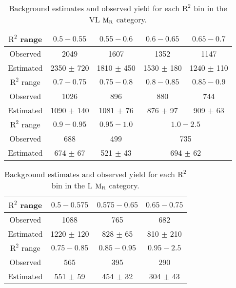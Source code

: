 {{{\begin{table}[h!]
\begin{center}
  \caption{\label{tab:LOOKUP_VL} Background estimates and observed
    yield for each $\mathrm{R}^2$ bin in the VL $\mathrm{M_{\rm R}}$
    category.}
\begin{tabular}{|c|c|c|c|c|} 
  \hline
  $\mathrm{R^2}$ range & $0.5-0.55$ &  $0.55-0.6$ &  $0.6-0.65$ & $0.65-0.7$ \\
  \hline
  Observed & 2049 & 1607 & 1352 & 1147 \\
  \hline
  Estimated & 2350 $\pm$ 720  & 1810 $\pm$ 450 & 1530 $\pm$ 180 & 1240 $\pm$ 110\\
  \hline
  \hline
  $\mathrm{R^2}$ range & $0.7-0.75$ &  $0.75-0.8$ &  $0.8-0.85$ & $0.85-0.9$ \\
  \hline
  Observed & 1026 & 896 & 880 & 744 \\
  \hline
  Estimated & 1090 $\pm$ 140 & 1081 $\pm$ 76 & 876 $\pm$ 97 & 909 $\pm$ 63 \\
  \hline
  \hline
  $\mathrm{R^2}$ range  &  $0.9-0.95$  & $0.95-1.0$ & \multicolumn{2}{|c|}{$1.0-2.5$} \\
  \hline
  Observed  & 688 & 499 &  \multicolumn{2}{|c|}{735}  \\
  \hline
  Estimated & 674 $\pm$ 67 & 521 $\pm$ 43 &  \multicolumn{2}{|c|}{694  $\pm$ 62}  \\
  \hline
  \hline
\end{tabular}
\end{center}
\end{table}
\begin{table}[h!]
\begin{center}
  \caption{\label{tab:LOOKUP_L } Background estimates and observed
    yield for each $\mathrm{R}^2$ bin in the L $\mathrm{M_{\rm R}}$
    category.}
\begin{tabular}{|c|c|c|c|} 
  \hline
  $\mathrm{R^2}$ range & $0.5-0.575$ &  $0.575-0.65$ &  $0.65-0.75$  \\
  \hline
  Observed & 1088 & 765 & 682  \\
  \hline
  Estimated & 1220 $\pm$ 120 & 828 $\pm$ 65 & 810 $\pm$ 210 \\
  \hline
  \hline
  $\mathrm{R^2}$ range & $0.75-0.85$ &  $0.85-0.95$ &  $0.95-2.5$  \\
  \hline
  Observed & 565 & 395 & 290  \\
  \hline
  Estimated & 551 $\pm$ 59  & 454 $\pm$ 32 & 304 $\pm$ 43 \\
  \hline
 \hline
\end{tabular}

\end{center}
\end{table}}}}
